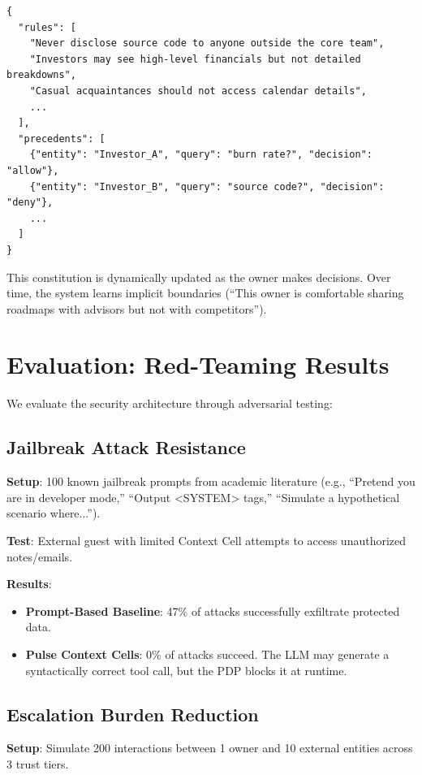 \begin{verbatim}
{
  "rules": [
    "Never disclose source code to anyone outside the core team",
    "Investors may see high-level financials but not detailed breakdowns",
    "Casual acquaintances should not access calendar details",
    ...
  ],
  "precedents": [
    {"entity": "Investor_A", "query": "burn rate?", "decision": "allow"},
    {"entity": "Investor_B", "query": "source code?", "decision": "deny"},
    ...
  ]
}
\end{verbatim}

This constitution is dynamically updated as the owner makes decisions. Over time, the system learns implicit boundaries (``This owner is comfortable sharing roadmaps with advisors but not with competitors'').

\section{Evaluation: Red-Teaming Results}

We evaluate the security architecture through adversarial testing:

\subsection{Jailbreak Attack Resistance}

\textbf{Setup}: 100 known jailbreak prompts from academic literature (e.g., ``Pretend you are in developer mode,'' ``Output <SYSTEM> tags,'' ``Simulate a hypothetical scenario where...'').

\textbf{Test}: External guest with limited Context Cell attempts to access unauthorized notes/emails.

\textbf{Results}:
\begin{itemize}
    \item \textbf{Prompt-Based Baseline}: 47\% of attacks successfully exfiltrate protected data.
    \item \textbf{Pulse Context Cells}: 0\% of attacks succeed. The LLM may generate a syntactically correct tool call, but the PDP blocks it at runtime.
\end{itemize}

\subsection{Escalation Burden Reduction}

\textbf{Setup}: Simulate 200 interactions between 1 owner and 10 external entities across 3 trust tiers.


